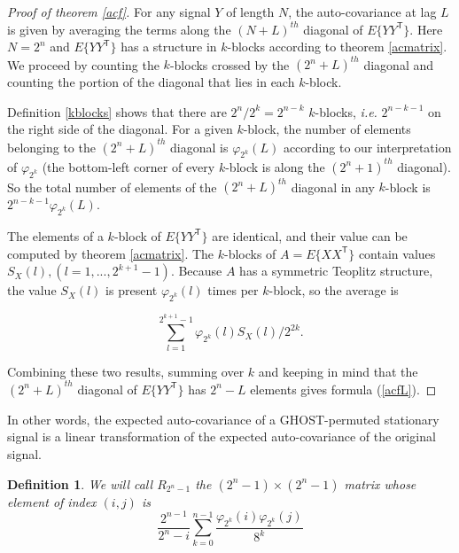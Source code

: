 \documentclass[12pt]{article}
\newtheorem{definition}{Definition}
\begin{document}
  \begin{proof}[Proof of theorem \ref{acf}]
    For any signal $Y$ of length $N$, the auto-covariance at lag $L$
    is given by averaging the terms along the $(N+L)^{th}$ diagonal of
    $E\{YY^{\mathsf{T}}\}$. Here $N = 2^n$ and $E\{YY^{\mathsf{T}}\}$
    has a structure in $k$-blocks according to theorem \ref{acmatrix}.
    We proceed by counting the $k$-blocks crossed by the $(2^n+L)^{th}$
    diagonal and counting the portion of the diagonal that lies in
    each $k$-block.

    Definition \ref{kblocks} shows that there are $2^n/2^k = 2^{n-k}$
    $k$-blocks, \textit{i.e.} $2^{n-k-1}$ on the right side of the
    diagonal. For a given $k$-block, the number of elements belonging
    to the $(2^n+L)^{th}$ diagonal is $\varphi_{2^k}(L)$ according
    to our interpretation of $\varphi_{2^k}$ (the bottom-left corner
    of every $k$-block is along the $(2^n+1)^{th}$ diagonal). So the total
    number of elements of the $(2^n+L)^{th}$ diagonal in any $k$-block is
    $2^{n-k-1}\varphi_{2^k}(L)$.

    The elements of a $k$-block of $E\{YY^{\mathsf{T}}\}$ are identical,
    and their value can be computed by theorem \ref{acmatrix}.
    The $k$-blocks of $A = E\{XX^{\mathsf{T}}\}$ contain values
    $S_X(l), (l=1, ..., 2^{k+1}-1)$. Because $A$ has a symmetric Teoplitz
    structure, the value $S_X(l)$ is present $\varphi_{2^k}(l)$ times
    per $k$-block, so the average is

    \begin{equation*}
      \sum_{l=1}^{2^{k+1}-1} \varphi_{2^k}(l) S_X(l) / 2^{2k}.
    \end{equation*}

    Combining these two results, summing over $k$ and keeping in mind
    that the $(2^n+L)^{th}$ diagonal of $E\{YY^{\mathsf{T}}\}$ has
    $2^n-L$ elements gives formula (\ref{acfL}).

  \end{proof}

  In other words, the expected auto-covariance of a GHOST-permuted
  stationary signal is a linear transformation of the expected
  auto-covariance of the original signal. 

  \begin{definition}\label{R}
    We will call $R_{2^n-1}$ the $(2^n-1) \times (2^n-1)$ matrix whose
    element of index $(i,j)$ is
    \begin{equation}
      \label{matrixelements}
        \frac{2^{n-1}}{2^n-i}\sum_{k=0}^{n-1}
          \frac{\varphi_{2^k}(i)\varphi_{2^k}(j)}{8^k}
    \end{equation}

  \end{definition}
\end{document}
